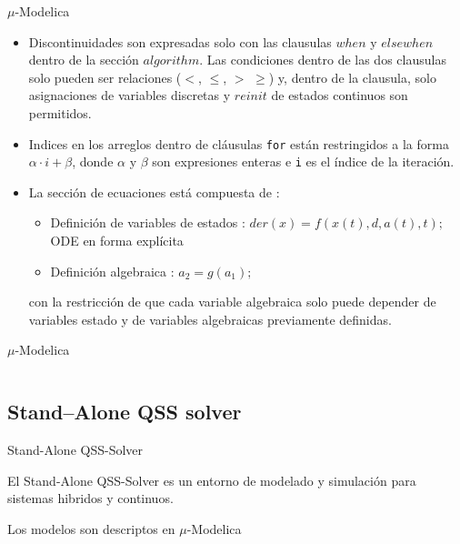 \documentclass[10pt,presentation]{beamer}
\begin{document}
\begin{frame}{$\mu$-Modelica}
	 \begin{itemize}
	 \item<1-> Discontinuidades son expresadas solo con las clausulas $when$ y $elsewhen$ dentro de la sección $algorithm$. Las condiciones dentro de las dos 
	clausulas solo pueden ser relaciones ($<$, $\leqslant$, $>$ $\geqslant$) y, dentro de la clausula, solo asignaciones de variables discretas y $reinit$ 
	de estados continuos son permitidos.

	\item<2-> Indices en los arreglos dentro de cláusulas \texttt{for} están restringidos a la forma $\alpha \cdot i + \beta$, donde $\alpha$ y $\beta$ son expresiones enteras e \texttt{i} es el índice de la iteración.
	\item<3-> La sección de ecuaciones está compuesta de :
	 \begin{itemize}
		\item Definición de variables de estados : $der(x) =  f (x(t), d, a(t), t);$ ODE en forma explícita
		\item Definición algebraica : $a_2  = g(a_1);$
	 \end{itemize}
	 con la restricción de que cada variable algebraica solo puede depender de variables estado y de variables algebraicas previamente definidas.
	\end{itemize}
\end{frame}

\begin{frame}{$\mu$-Modelica}
	\inputminted[linenos]{modelica}{slides/lotka_volterra_qss.mo}
\end{frame}

	\subsection{Stand–Alone QSS solver}

\begin{frame}{Stand-Alone QSS-Solver}

\begin{block}{El Stand-Alone QSS-Solver}
es un entorno de modelado y simulación para sistemas hibridos y continuos.
\end{block}

\begin{block}{Los modelos}
son  descriptos en $\mu$-Modelica
\end{block}
\end{frame}
\end{document}
